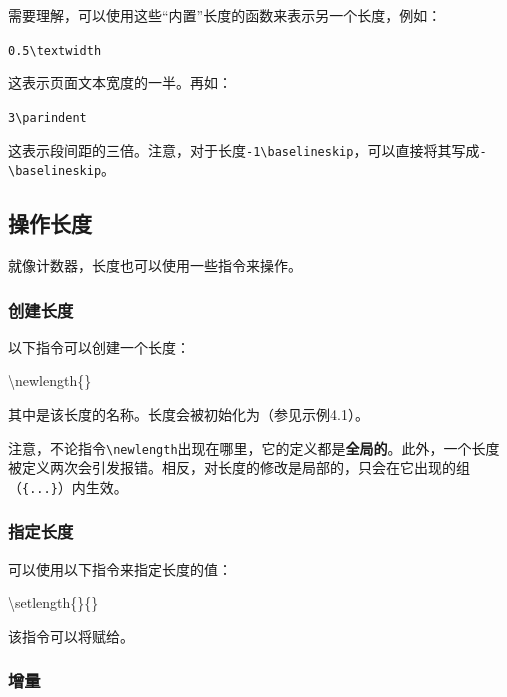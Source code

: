 需要理解，可以使用这些“内置”长度的函数来表示另一个长度，例如：

\begin{dmd}
\verb|0.5\textwidth|
\end{dmd}

这表示页面文本宽度的一半。再如：

\begin{dmd}
\verb|3\parindent|
\end{dmd}

这表示段间距的三倍。注意，对于长度\verb|-1\baselineskip|，可以直接将其写成\verb|-\baselineskip|。

\subsection{操作长度}

就像计数器，长度也可以使用一些指令来操作。

\subsubsection{创建长度}

以下指令可以创建一个长度：

\begin{dmd}
\backslash newlength\{\}
\end{dmd}

其中是该长度的名称。长度会被初始化为\dm{0pt}（参见示例4.1）。

\begin{exclamation}
注意，不论指令\verb|\newlength|出现在哪里，它的定义都是\textbf{全局的}。此外，一个长度被定义两次会引发报错。相反，对长度的修改是局部的，只会在它出现的组（\verb|{...}|）内生效。
\end{exclamation}

\subsubsection{指定长度}

可以使用以下指令来指定长度的值：

\begin{dmd}
\backslash setlength\{\}\{\}
\end{dmd}

该指令可以将赋给。

\subsubsection{增量}


